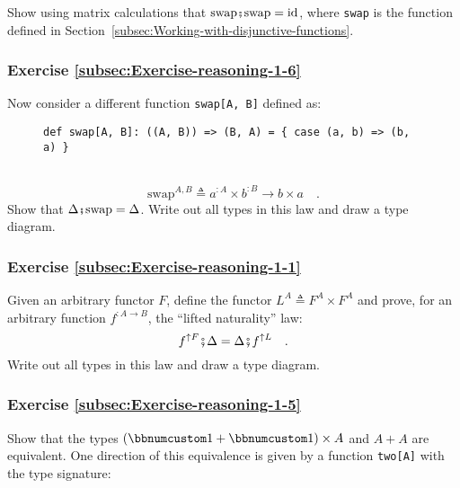 Show using matrix calculations that $\text{swap}\bef\text{swap}=\text{id}$,
where \lstinline!swap! is the function defined in Section~\ref{subsec:Working-with-disjunctive-functions}.

\subsubsection{Exercise \label{subsec:Exercise-reasoning-1-6}\ref{subsec:Exercise-reasoning-1-6}}

Now consider a different function \lstinline!swap[A, B]! defined
as:

\begin{wrapfigure}{L}{0.63\columnwidth}%
\vspace{-0.9\baselineskip}
\begin{lstlisting}
def swap[A, B]: ((A, B)) => (B, A) = { case (a, b) => (b, a) }
\end{lstlisting}

\vspace{-0.25\baselineskip}
\end{wrapfigure}%

~\vspace{-1.25\baselineskip}
\[
\text{swap}^{A,B}\triangleq a^{:A}\times b^{:B}\rightarrow b\times a\quad.
\]
\vspace{-0.15\baselineskip}
Show that $\Delta\bef\text{swap}=\Delta$. Write out all types in
this law and draw a type diagram.

\subsubsection{Exercise \label{subsec:Exercise-reasoning-1-1}\ref{subsec:Exercise-reasoning-1-1}}

Given an arbitrary functor $F$, define the functor $L^{A}\triangleq F^{A}\times F^{A}$
and prove, for an arbitrary function $f^{:A\rightarrow B}$, the \textsf{``}lifted
naturality\textsf{''} law:
\[
f^{\uparrow F}\bef\Delta=\Delta\bef f^{\uparrow L}\quad.
\]
Write out all types in this law and draw a type diagram.

\subsubsection{Exercise \label{subsec:Exercise-reasoning-1-5}\ref{subsec:Exercise-reasoning-1-5}}

Show that the types $(\bbnum 1+\bbnum 1)\times A$ and $A+A$ are
equivalent. One direction of this equivalence is given by a function
\lstinline!two[A]! with the type signature:

